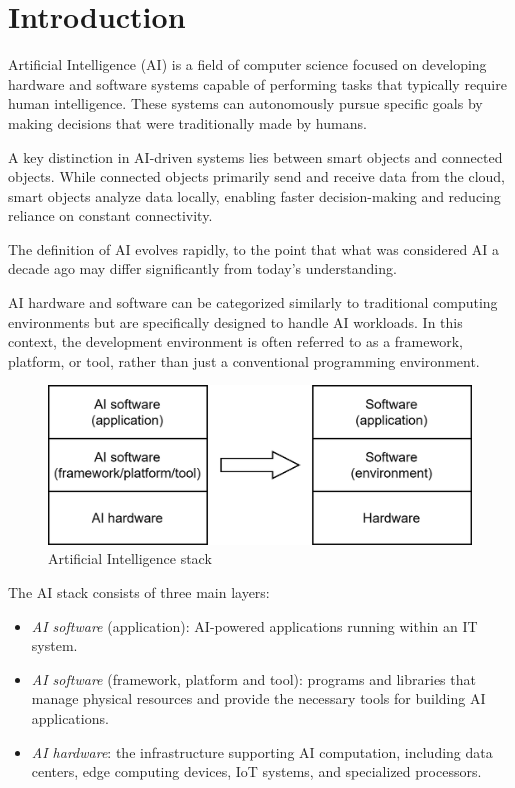 \section{Introduction}

Artificial Intelligence (AI) is a field of computer science focused on developing hardware and software systems capable of performing tasks that typically require human intelligence. 
These systems can autonomously pursue specific goals by making decisions that were traditionally made by humans.

A key distinction in AI-driven systems lies between smart objects and connected objects.
While connected objects primarily send and receive data from the cloud, smart objects analyze data locally, enabling faster decision-making and reducing reliance on constant connectivity.

The definition of AI evolves rapidly, to the point that what was considered AI a decade ago may differ significantly from today's understanding.

AI hardware and software can be categorized similarly to traditional computing environments but are specifically designed to handle AI workloads. 
In this context, the development environment is often referred to as a framework, platform, or tool, rather than just a conventional programming environment.
\begin{figure}[H]
    \centering
    \includegraphics[width=0.5\linewidth]{images/eeai1.png}
    \caption{Artificial Intelligence stack}
\end{figure}
The AI stack consists of three main layers:
\begin{itemize}
    \item \textit{AI software} (application): AI-powered applications running within an IT system.
    \item \textit{AI software} (framework, platform and tool): programs and libraries that manage physical resources and provide the necessary tools for building AI applications.
    \item \textit{AI hardware}: the infrastructure supporting AI computation, including data centers, edge computing devices, IoT systems, and specialized processors.
\end{itemize}
